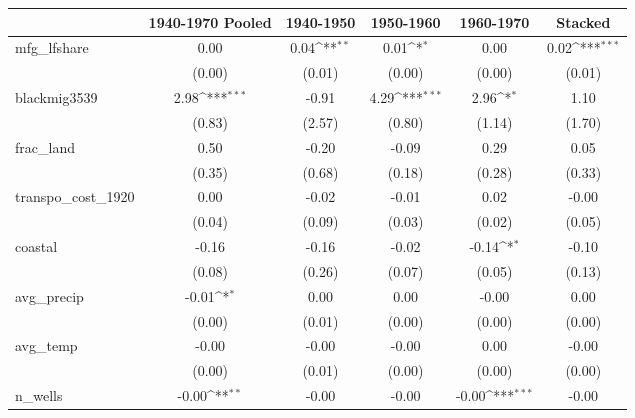 {
\def\sym#1{\ifmmode^{#1}\else\(^{#1}\)\fi}
\begin{tabular}{l*{5}{c}}
\toprule
          &\multicolumn{1}{c}{1940-1970 Pooled}&\multicolumn{1}{c}{1940-1950}&\multicolumn{1}{c}{1950-1960}&\multicolumn{1}{c}{1960-1970}&\multicolumn{1}{c}{Stacked}\\
\midrule
mfg\_lfshare&     0.00         &     0.04\sym{**} &     0.01\sym{*}  &     0.00         &     0.02\sym{***}\\
          &   (0.00)         &   (0.01)         &   (0.00)         &   (0.00)         &   (0.01)         \\
\addlinespace
blackmig3539&     2.98\sym{***}&    -0.91         &     4.29\sym{***}&     2.96\sym{*}  &     1.10         \\
          &   (0.83)         &   (2.57)         &   (0.80)         &   (1.14)         &   (1.70)         \\
\addlinespace
frac\_land &     0.50         &    -0.20         &    -0.09         &     0.29         &     0.05         \\
          &   (0.35)         &   (0.68)         &   (0.18)         &   (0.28)         &   (0.33)         \\
\addlinespace
transpo\_cost\_1920&     0.00         &    -0.02         &    -0.01         &     0.02         &    -0.00         \\
          &   (0.04)         &   (0.09)         &   (0.03)         &   (0.02)         &   (0.05)         \\
\addlinespace
coastal   &    -0.16         &    -0.16         &    -0.02         &    -0.14\sym{*}  &    -0.10         \\
          &   (0.08)         &   (0.26)         &   (0.07)         &   (0.05)         &   (0.13)         \\
\addlinespace
avg\_precip&    -0.01\sym{*}  &     0.00         &     0.00         &    -0.00         &     0.00         \\
          &   (0.00)         &   (0.01)         &   (0.00)         &   (0.00)         &   (0.00)         \\
\addlinespace
avg\_temp  &    -0.00         &    -0.00         &    -0.00         &     0.00         &    -0.00         \\
          &   (0.00)         &   (0.01)         &   (0.00)         &   (0.00)         &   (0.00)         \\
\addlinespace
n\_wells   &    -0.00\sym{**} &    -0.00         &    -0.00         &    -0.00\sym{***}&    -0.00         \\

\end{tabular}}

